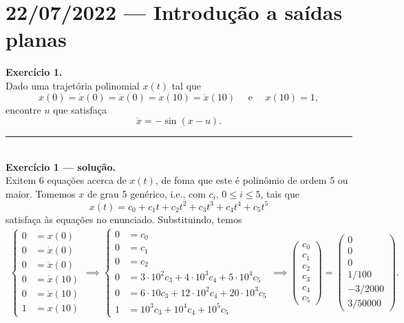 \section*{22/07/2022 --- Introdução a saídas planas}
\noindent\textbf{\sffamily Exercício 1.}\\
	Dado uma trajetória polinomial $x(t)$ tal que 
	\[
		x(0) = \dot{x}(0) = \ddot{x}(0) 
		     = \dot{x}(10)= \ddot{x}(10)
		\quad\text{ e }\quad
		x(10) = 1,
	\]
	encontre $u$ que satisfaça 
	\[
		\ddot{x} = -\sin(x-u).
	\]
	\rule{\textwidth}{0.5pt}\\

\noindent\textbf{\sffamily Exercício 1 --- solução.}\\
	Exitem $6$ equações acerca de $x(t)$, de foma que este é polinômio de ordem $5$ ou maior. 
	Tomemos $x$ de grau 5 genérico, i.e., com $c_i$, $0\leq i\leq 5$, tais que
	\[
		x(t) = c_0 + c_1t + c_2t^2 + c_3t^3 + c_4t^4 + c_5t^5
	\]
	satisfaça às equações no enunciado. Substituindo, temos
	\begin{align*}
		\left\{
			\begin{array}{rl}
				0 &= x(0)         \\ 
				0 &= \dot{x}(0)   \\ 
				0 &= \ddot{x}(0)  \\ 
				0 &= \dot{x}(10)  \\ 
				0 &= \ddot{x}(10) \\ 
				1 &= x(10)     
			\end{array}
		\right.
		\implies
		\left\{
			\begin{array}{rl}
				0 &= c_0 \\ 
				0 &= c_1 \\ 
				0 &= c_2 \\ 
				0 &= 3\cdot 10^2c_3 + 4\cdot 10^3 c_4 + 5\cdot 10^4 c_5 \\ 
				0 &= 6\cdot 10c_3 + 12\cdot 10^2 c_4 + 20\cdot 10^3 c_5 \\ 
				1 &= 10^3c_3 + 10^4c_4 + 10^5c_5 
			\end{array}
		\right.
		\implies
		\begin{pmatrix} 
			c_0 \\ c_1 \\ c_2 \\ c_3 \\ c_4 \\ c_5
		\end{pmatrix}
		= 
		\begin{pmatrix} 
			0 \\ 0 \\ 0 \\ 1/100 \\ -3/2000 \\ 3/50000
		\end{pmatrix}.
	\end{align*}
